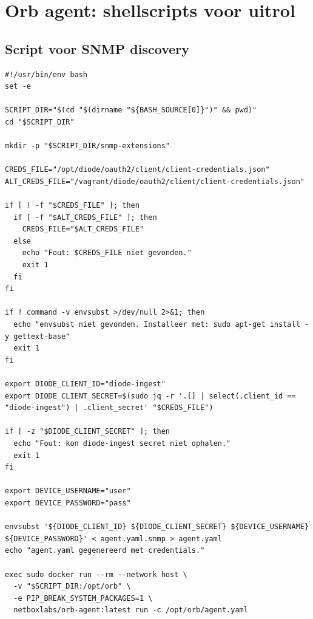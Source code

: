 \section{Orb agent: shellscripts voor uitrol}
\label{sec:bijlage-orb-scripts}

\subsection{Script voor SNMP discovery}

\begin{listing}[H]
  \caption[Shellscript voor SNMP-discovery uitrol]{Volledig shellscript voor het genereren van \texttt{agent.yaml} voor SNMP discovery (\S\ref{sec:schaalbaarheid})}
  \label{lst:orb-snmp-script}
  \begin{verbatim}
#!/usr/bin/env bash
set -e

SCRIPT_DIR="$(cd "$(dirname "${BASH_SOURCE[0]}")" && pwd)"
cd "$SCRIPT_DIR"

mkdir -p "$SCRIPT_DIR/snmp-extensions"

CREDS_FILE="/opt/diode/oauth2/client/client-credentials.json"
ALT_CREDS_FILE="/vagrant/diode/oauth2/client/client-credentials.json"

if [ ! -f "$CREDS_FILE" ]; then
  if [ -f "$ALT_CREDS_FILE" ]; then
    CREDS_FILE="$ALT_CREDS_FILE"
  else
    echo "Fout: $CREDS_FILE niet gevonden."
    exit 1
  fi
fi

if ! command -v envsubst >/dev/null 2>&1; then
  echo "envsubst niet gevonden. Installeer met: sudo apt-get install -y gettext-base"
  exit 1
fi

export DIODE_CLIENT_ID="diode-ingest"
export DIODE_CLIENT_SECRET=$(sudo jq -r '.[] | select(.client_id == "diode-ingest") | .client_secret' "$CREDS_FILE")

if [ -z "$DIODE_CLIENT_SECRET" ]; then
  echo "Fout: kon diode-ingest secret niet ophalen."
  exit 1
fi

export DEVICE_USERNAME="user"
export DEVICE_PASSWORD="pass"

envsubst '${DIODE_CLIENT_ID} ${DIODE_CLIENT_SECRET} ${DEVICE_USERNAME} ${DEVICE_PASSWORD}' < agent.yaml.snmp > agent.yaml
echo "agent.yaml gegenereerd met credentials."

exec sudo docker run --rm --network host \
  -v "$SCRIPT_DIR:/opt/orb" \
  -e PIP_BREAK_SYSTEM_PACKAGES=1 \
  netboxlabs/orb-agent:latest run -c /opt/orb/agent.yaml
  \end{verbatim}
\end{listing}

